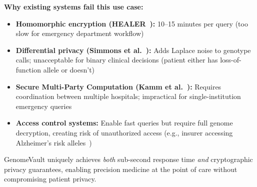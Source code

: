 \textbf{Why existing systems fail this use case:}
\begin{itemize}
\item \textbf{Homomorphic encryption (HEALER~\cite{healer2020}):} 10--15 minutes per query (too slow for emergency department workflow)
\item \textbf{Differential privacy (Simmons et al.~\cite{Simmons2016}):} Adds Laplace noise to genotype calls; unacceptable for binary clinical decisions (patient either has loss-of-function allele or doesn't)
\item \textbf{Secure Multi-Party Computation (Kamm et al.~\cite{Kamm2013}):} Requires coordination between multiple hospitals; impractical for single-institution emergency queries
\item \textbf{Access control systems:} Enable fast queries but require full genome decryption, creating risk of unauthorized access (e.g., insurer accessing Alzheimer's risk alleles~\cite{Erlich2018})
\end{itemize}

GenomeVault uniquely achieves \textit{both} sub-second response time \textit{and} cryptographic privacy guarantees, enabling precision medicine at the point of care without compromising patient privacy.

%
%
%
